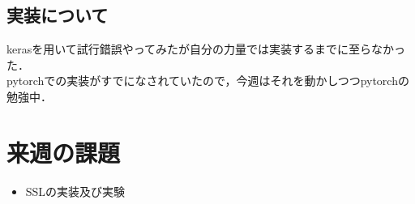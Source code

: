 \documentclass[twocolumn]{jarticle}     %
\begin{document}
\subsection{実装について}
kerasを用いて試行錯誤やってみたが自分の力量では実装するまでに至らなかった．\\
pytorchでの実装がすでになされていたので，今週はそれを動かしつつpytorchの勉強中．



\section{来週の課題}
\begin{itemize}
	\item SSLの実装及び実験
\end{itemize}
\end{document}
